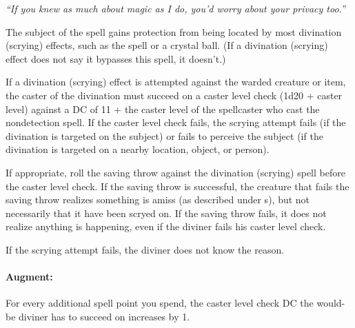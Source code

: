 \emph{``If you knew as much about magic as I do, you'd worry about your privacy too.''}

The subject of the spell gains protection from being located by most divination (scrying) effects, 
such as the  spell or a crystal ball. 
(If a divination (scrying) effect does not say it bypasses this spell, it doesn't.)

If a divination (scrying) effect is attempted against the warded creature or item, 
the caster of the divination must succeed on a caster level check (1d20 + caster level) 
against a DC of 11 + the caster level of the spellcaster who cast the nondetection spell.
If the caster level check fails, the scrying attempt fails
(if the divination is targeted on the subject) or fails to perceive the subject 
(if the divination is targeted on a nearby location, object, or person).

If appropriate, roll the saving throw against the divination (scrying) spell before the caster level check.
If the saving throw is successful, the creature that fails the saving throw realizes something is amiss 
(as described under s),
but not necessarily that it have been scryed on.
If the saving throw fails, it does not realize anything is happening, even if the diviner fails his caster level check.

If the scrying attempt fails, the diviner does not know the reason.

\paragraph{Augment:} For every additional spell point you spend, the caster level check DC the would-be diviner has to succeed on increases by 1.
